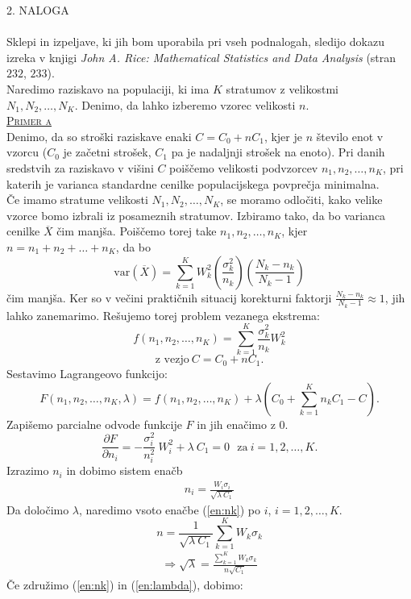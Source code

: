 \documentclass[a4paper,12pt]{article}
\begin{document}

\noindent
\textsc{\large{2. NALOGA}}
\\
\\
Sklepi in izpeljave, ki jih bom uporabila pri vseh podnalogah, sledijo dokazu izreka v knjigi \textit{John A. Rice: Mathematical Statistics and Data Analysis} (stran $232$, $233$).
\\
Naredimo raziskavo na populaciji, ki ima $K$ stratumov z velikostmi 
\\
$N_1, N_2, \ldots, N_K$. Denimo, da lahko izberemo vzorec velikosti $n$.
\\

\noindent
\textsc{\underline{Primer a}}
\\
Denimo, da so stroški raziskave enaki $C = C_0 + n C_1$, kjer je $n$ število enot v vzorcu ($C_0$ je začetni strošek, $C_1$ pa je nadaljnji strošek na enoto). Pri danih sredstvih za raziskavo v višini $C$ poiščemo velikosti podvzorcev $n_1, n_2, \ldots, n_K$, pri katerih je varianca standardne cenilke populacijskega povprečja minimalna.
\\
Če imamo stratume velikosti $N_1, N_2, \ldots, N_K$, se moramo odločiti, kako velike vzorce bomo izbrali iz posameznih stratumov. Izbiramo tako, da bo varianca cenilke $\overline{X}$ čim manjša. 
Poiščemo torej take $n_1, n_2, \ldots, n_K$, kjer $n = n_1 + n_2 + \ldots + n_K$, da bo $$ \text{var}(\overline{X}) = \sum_{k = 1}^{K} W_k ^ 2 \left( \frac{ \sigma_k^2}{n_k} \right) \left( \frac{N_k - n_k}{N_k - 1} \right) $$
čim manjša.
Ker so v večini praktičnih situacij korekturni faktorji $\frac{N_k - n_k}{N_k - 1} \approx 1$, jih lahko zanemarimo. Rešujemo torej problem vezanega ekstrema:
$$ f(n_1, n_2, \ldots, n_K) = \sum_{k = 1}^{K} \frac{\sigma_k^2}{n_k} W_k^2 $$
$$ \text{z vezjo} \  C = C_0 + nC_1.$$
Sestavimo Lagrangeovo funkcijo:
$$ F(n_1, n_2, \ldots, n_K, \lambda) = f(n_1, n_2, \ldots, n_K) + \lambda (C_0 + \sum_{k = 1}^{K} n_k C_1 - C). $$
Zapišemo parcialne odvode funkcije $F$ in jih enačimo z $0$.
$$ \frac{ \partial F}{\partial n_i} = - \frac{ \sigma_i^2}{n_i^2} \  W_i^2 + \lambda \ C_1 = 0 \ \ \ \text{za} \ i = 1, 2, \ldots, K. $$
Izrazimo $n_i$ in dobimo sistem enačb
\begin{align}\label{en:nk}
n_i = \frac{W_i \sigma_i}{ \sqrt{ \lambda \ C_1}}
\end{align}
Da določimo $\lambda$, naredimo vsoto enačbe (\ref{en:nk}) po $i$, $i = 1, 2, \ldots, K.$
$$ n = \frac{1}{\sqrt{\lambda \ C_1}} \sum_{k = 1}^{K} W_k \sigma_k $$
\begin{align}\label{en:lambda}
\Rightarrow \sqrt{\lambda} = \frac{\sum_{k = 1}^{K} W_k \sigma_k}{n \sqrt{C_1}}
\end{align}
Če združimo (\ref{en:nk}) in (\ref{en:lambda}), dobimo:
\end{document}
